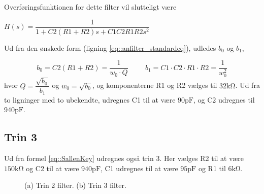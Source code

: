 Overføringsfunktionen for dette filter vil slutteligt være\\

\begin{center}
\begin{math}
H(s) = \dfrac{1}{1+C2(R1+R2) s+C1C2R1R2 s^2}
\label{eq::SallenKey}
\end{math}
\end{center} 
Ud fra den ønskede form (ligning \ref{eq::anfilter_standardeq}), udledes $b_0$ og $b_1$,

\begin{equation}
	 b_0 = C2(R1+R2) = \dfrac{1}{w_0\cdot Q} \hspace{1cm} b_1 = C1 \cdot C2 \cdot R1 \cdot R2 = \dfrac{1}{w_0^2} \nonumber
\end{equation}
hvor $Q = \dfrac{\sqrt{b_0}}{b_1}$ og $w_0 = \sqrt{b_0}$, og komponenterne R1 og R2 vælges til $32\si{\kilo\ohm}$. Ud fra to ligninger med to ubekendte, udregnes C1 til at være $90 \si{\pico\farad}$, og C2 udregnes til $940\si{\pico\farad}$.
\subsection{Trin 3}
Ud fra formel \ref{eq::SallenKey} udregnes også trin 3. Her vælges R2 til at være $150\si{\kilo\ohm}$ og C2 til at være $940\si{\pico\farad}$, C1 udregnes til at være $95\si{\pico\farad}$ og R1 til $6 \si{\kilo\ohm} $. 

\begin{figure}[h]
	\centering
	\caption{(a) Trin 2 filter. (b) Trin 3 filter.}
\end{figure}
\FloatBlock
{}
